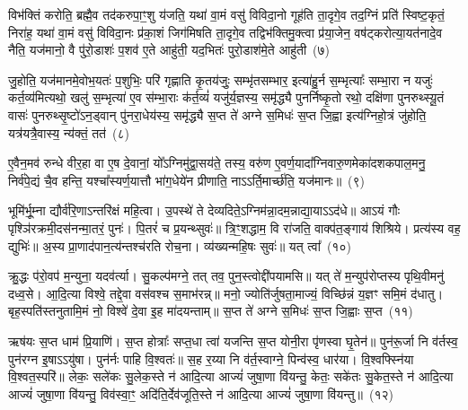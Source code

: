 विभ॑क्तिं करोति॒ ब्रह्मै॒व तद॑करुपा॒ꣳ॒शु य॑जति॒ यथा॑ वा॒मं वसु॑ विविदा॒नो गूह॑ति ता॒दृगे॒व तद॒ग्निं प्रति॑ स्विष्ट॒कृतं॒ निरा॑ह॒ यथा॑ वा॒मं वसु॑ विविदा॒नः प्र॑का॒शं जिग॑मिषति ता॒दृगे॒व तद्विभ॑क्तिमु॒क्त्वा प्र॑या॒जेन॒ वष॑ट्करोत्या॒यत॑नादे॒व नैति॒ यज॑मानो॒ वै पु॑रो॒डाशः॑ प॒शव॑ ए॒ते आहु॑ती॒ यद॒भितः॑ पुरो॒डाश॑मे॒ते आहु॑ती~(७)\ip

जु॒होति॒ यज॑मानमे॒वोभ॒यतः॑ प॒शुभिः॒ परि॑ गृह्णाति कृ॒तय॑जुः॒ सम्भृ॑तसम्भार॒ इत्या॑हु॒र्न स॒म्भृत्याः᳚ सम्भा॒रा न यजुः॑ कर्त॒व्य॑मित्यथो॒ खलु॑ स॒म्भृत्या॑ ए॒व स॑म्भा॒राः क॑र्त॒व्यं॑ यजु॑र्य॒ज्ञस्य॒ समृ॑द्ध्यै पुनर्निष्कृ॒तो रथो॒ दक्षि॑णा पुनरुथ्स्यू॒तं वासः॑ पुनरुथ्सृ॒ष्टो॑\-ऽन॒ड्वान् पु॑नरा॒धेय॑स्य॒ समृ॑द्ध्यै स॒प्त ते॑ अग्ने स॒मिधः॑ स॒प्त जि॒ह्वा इत्य॑ग्निहो॒त्रं जु॑होति॒ यत्र॑यत्रै॒वास्य॒ न्य॑क्तं॒ तत॑~(८)\ip

ए॒वैन॒मव॑ रुन्धे वीर॒हा वा ए॒ष दे॒वानां॒ यो᳚\-ऽग्निमु॑द्वा॒सय॑ते॒ तस्य॒ वरु॑ण ए॒वर्ण॒यादा᳚ग्निवारु॒णमेका॑\-दश\-कपाल॒मनु॒ निर्व॑पे॒द्यं चै॒व हन्ति॒ यश्चा᳚स्यर्ण॒यात्तौ भा॑ग॒धेये॑न प्रीणाति॒ ना\-ऽऽ\-र्ति॒मार्च्छ॑ति॒ यज॑मानः॥~(९)\ip

{\anuvakamend[{आ\-ऽप॑राभावाय पुरो॒डाश॑मे॒ते आहु॑ती॒ ततः॒ षट्त्रिꣳ॑शच्च}]}

भूमि॑र्भू॒म्ना द्यौर्व॑रि॒णा\-ऽन्तरि॑क्षं महि॒त्वा। उ॒पस्थे॑ ते देव्यदिते॒\-ऽग्निम॑न्ना॒दम॒न्नाद्या॒या\-ऽऽ\-द॑धे॥ आ\-ऽयं गौः पृश्ञि॑रक्रमी॒दस॑नन्मा॒तरं॒ पुनः॑। पि॒तरं॑ च प्र॒यन्थ्सुवः॑॥ त्रि॒ꣳ॒शद्धाम॒ वि रा॑जति॒ वाक्प॑त॒ङ्गाय॑ शिश्रिये। प्रत्य॑स्य वह॒ द्युभिः॑॥ अ॒स्य प्रा॒णाद॑पान॒त्य॑न्तश्च॑रति रोच॒ना। व्य॑ख्यन्महि॒षः सुवः॑॥ यत् त्वा᳚~(१०)\ip

क्रु॒द्धः प॑रो॒वप॑ म॒न्युना॒ यदव॑र्त्या। सु॒कल्प॑मग्ने॒ तत् तव॒ पुन॒स्त्वोद्दी॑पयामसि॥ यत् ते॑ म॒न्युप॑रोप्तस्य पृथि॒वीमनु॑ दध्व॒से। आ॒दि॒त्या विश्वे॒ तद्दे॒वा वस॑वश्च स॒माभ॑रन्न्॥ मनो॒ ज्योति॑र्जुषता॒माज्यं॒ विच्छि॑न्नं य॒ज्ञꣳ समि॒मं द॑धातु। बृह॒स्पति॑स्तनुतामि॒मं नो॒ विश्वे॑ दे॒वा इ॒ह मा॑दयन्ताम्॥ स॒प्त ते॑ अग्ने स॒मिधः॑ स॒प्त जि॒ह्वाः स॒प्त~(११)\ip

ऋष॑यः स॒प्त धाम॑ प्रि॒याणि॑। स॒प्त होत्राः᳚ सप्त॒धा त्वा॑ यजन्ति स॒प्त योनी॒रा पृ॑णस्वा घृ॒तेन॑॥ पुन॑रू॒र्जा नि व॑र्तस्व॒ पुन॑रग्न इ॒षा\-ऽऽ\-यु॑षा। पुन॑र्नः पाहि वि॒श्वतः॑॥ स॒ह र॒य्या नि व॑र्त॒स्वाग्ने॒ पिन्व॑स्व॒ धार॑या। वि॒श्वफ्स्नि॑या वि॒श्वत॒स्परि॑॥ लेकः॒ सले॑कः सु॒लेक॒स्ते न॑ आदि॒त्या आज्यं॑ जुषा॒णा वि॑यन्तु॒ केतः॒ सके॑तः सु॒केत॒स्ते न॑ आदि॒त्या आज्यं॑ जुषा॒णा वि॑यन्तु॒ विव॑स्वा॒ꣳ॒ अदि॑ति॒र्देव॑जूति॒स्ते न॑ आदि॒त्या आज्यं॑ जुषा॒णा वि॑यन्तु॥~(१२)\ip

{\anuvakamend[{त्वा॒ जि॒ह्वाः स॒प्त सु॒केत॒स्ते न॒स्त्रयो॑दश च}]}

